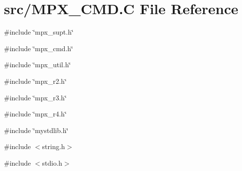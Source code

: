 \hypertarget{_m_p_x___c_m_d_8_c}{
\section{src/MPX\_\-CMD.C File Reference}
\label{_m_p_x___c_m_d_8_c}
}
{\ttfamily \#include \char`\"{}mpx\_\-supt.h\char`\"{}}\par
{\ttfamily \#include \char`\"{}mpx\_\-cmd.h\char`\"{}}\par
{\ttfamily \#include \char`\"{}mpx\_\-util.h\char`\"{}}\par
{\ttfamily \#include \char`\"{}mpx\_\-r2.h\char`\"{}}\par
{\ttfamily \#include \char`\"{}mpx\_\-r3.h\char`\"{}}\par
{\ttfamily \#include \char`\"{}mpx\_\-r4.h\char`\"{}}\par
{\ttfamily \#include \char`\"{}mystdlib.h\char`\"{}}\par
{\ttfamily \#include $<$string.h$>$}\par
{\ttfamily \#include $<$stdio.h$>$}\par
